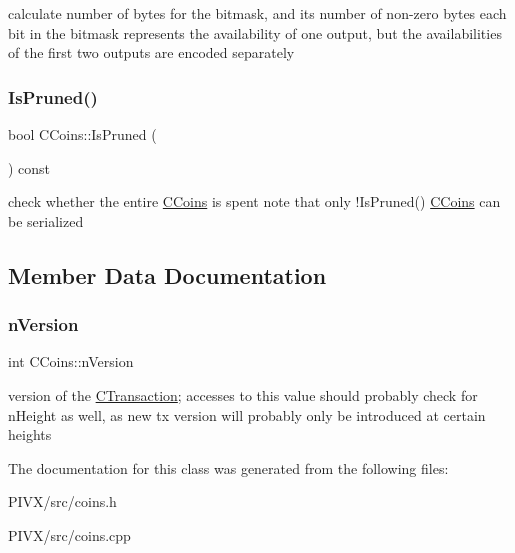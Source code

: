 calculate number of bytes for the bitmask, and its number of non-\/zero bytes each bit in the bitmask represents the availability of one output, but the availabilities of the first two outputs are encoded separately \mbox{\label{class_c_coins_a597a7cb8830fc29565918ce1823b2244}} 
\subsubsection{\texorpdfstring{Is\+Pruned()}{IsPruned()}}
{\footnotesize\ttfamily bool C\+Coins\+::\+Is\+Pruned (\begin{DoxyParamCaption}{ }\end{DoxyParamCaption}) const\hspace{0.3cm}{\ttfamily [inline]}}

check whether the entire \mbox{\hyperlink{class_c_coins}{C\+Coins}} is spent note that only !\+Is\+Pruned() \mbox{\hyperlink{class_c_coins}{C\+Coins}} can be serialized 

\subsection{Member Data Documentation}
\mbox{\label{class_c_coins_a96fea4ee8841e9ce32f60c2e7e3cf6b6}} 
\subsubsection{\texorpdfstring{n\+Version}{nVersion}}
{\footnotesize\ttfamily int C\+Coins\+::n\+Version}

version of the \mbox{\hyperlink{class_c_transaction}{C\+Transaction}}; accesses to this value should probably check for n\+Height as well, as new tx version will probably only be introduced at certain heights 

The documentation for this class was generated from the following files\+:\begin{DoxyCompactItemize}
\item 
P\+I\+V\+X/src/coins.\+h\item 
P\+I\+V\+X/src/coins.\+cpp\end{DoxyCompactItemize}
